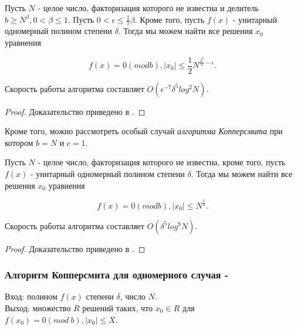   \begin{theorem}[Копперсмита] \label{th:commpersmith}
    Пусть {$N$} - целое число, факторизация которого не известна и делитель {$b \ge N^\beta, 0 < \beta \le 1$}. Пусть {$0 < \epsilon \le \frac{1}{7}\beta$}.
    Кроме того, пусть {$f(x)$} - унитарный одномерный полином степени {$\delta$}. Тогда мы можем найти все решения {$x_0$} уравнения
    
      \begin{equation}
        f(x) = 0 (mod b), |x_0| \le \frac{1}{2} N^{\frac{\beta^2}{\delta} - \epsilon}.
      \end{equation}

    Скорость работы алгоритма составляет {$O(\epsilon^{-7} \delta^5 log^2 N)$}.
    
    \begin{proof}
      Доказательство приведено в \cite[страницы 323-326]{may10}.
    \end{proof}

  \end{theorem}

    Кроме того, можно рассмотреть особый случай \textit{алгоритма Копперсмита} при котором $b=N$ и $c=1$.

  \begin{theorem}
    Пусть {$N$} - целое число, факторизация которого не известна, кроме того, пусть {$f(x)$} - унитарный одномерный полином степени {$\delta$}. Тогда 
    мы можем найти все решения {$x_0$} уравнения

      \begin{equation}
        f(x) = 0 (mod b), |x_0| \le N^{\frac{1}{\delta}}.
      \end{equation}

    Скорость работы алгоритма составляет {$O(\delta^5 log^9 N)$}.
    \begin{proof}
      Доказательство приведено в \cite[страницы 326-327]{may10}.
    \end{proof}
  \end{theorem}

  \subsubsection{Алгоритм Копперсмита для одномерного случая - \cite[страницы 321-327]{may10}}
    Вход: полином {$f(x)$} степени {$\delta$}, число {$N$}. \\
    Выход: множество {$R$} решений таких, что {$x_0 \in R$} для {$f(x_0) = 0 (mod \: b), |x_0| \le X$}.
    
